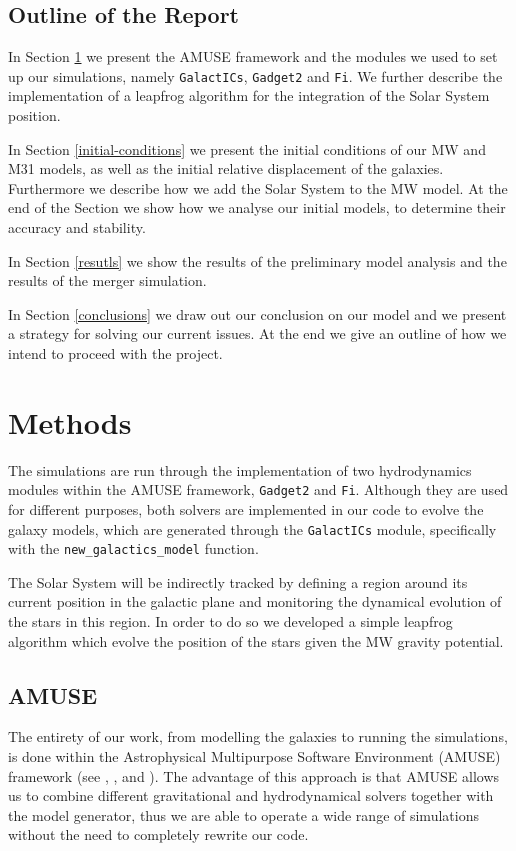 \documentclass[a4paper,12pt, english]{article}
\begin{document}
\subsection{Outline of the Report}
\label{outline}
In Section \ref{methods} we present the AMUSE framework and the modules we used to set up our simulations, namely \texttt{GalactICs}, \texttt{Gadget2} and \texttt{Fi}. We further describe the implementation of a leapfrog algorithm for the integration of the Solar System position.\par
\smallskip
In Section \ref{initial-conditions} we present the initial conditions of our MW and M31 models, as well as the initial relative displacement of the galaxies. Furthermore we describe how we add the Solar System to the MW model. At the end of the Section we show how we analyse our initial models, to determine their accuracy and stability.\par
\smallskip
In Section \ref{resutls} we show the results of the preliminary model analysis and the results of the merger simulation.\par
\smallskip
In Section \ref{conclusions} we draw out our conclusion on our model and we present a strategy for solving our current issues. At the end we give an outline of how we intend to proceed with the project.\par
\newpage

\section{Methods}
\label{methods}
The simulations are run through the implementation of two hydrodynamics modules within the AMUSE framework, \texttt{Gadget2} and \texttt{Fi}. Although they are used for different purposes, both solvers are implemented in our code to evolve the galaxy models, which are generated through the \texttt{GalactICs} module, specifically with the \texttt{new\_galactics\_model} function.\par
\smallskip
The Solar System will be indirectly tracked by defining a region around its current position in the galactic plane and monitoring the dynamical evolution of the stars in this region. In order to do so we developed a simple leapfrog algorithm which evolve the position of the stars given the MW gravity potential.\par
\smallskip

\subsection{AMUSE}
\label{amuse}
The entirety of our work, from modelling the galaxies to running the simulations, is done within the Astrophysical Multipurpose Software Environment (AMUSE) framework (see \textcite{Portegies_Zwart_McMillan_2018}, \textcite{Portegies_Zwart_2013}, \textcite{Pelupessy_2013} and \textcite{Portegies_Zwart_2009}). The advantage of this approach is that AMUSE allows us to combine different gravitational and hydrodynamical solvers together with the model generator, thus we are able to operate a wide range of simulations without the need to completely rewrite our code.\par
\smallskip
\end{document}
